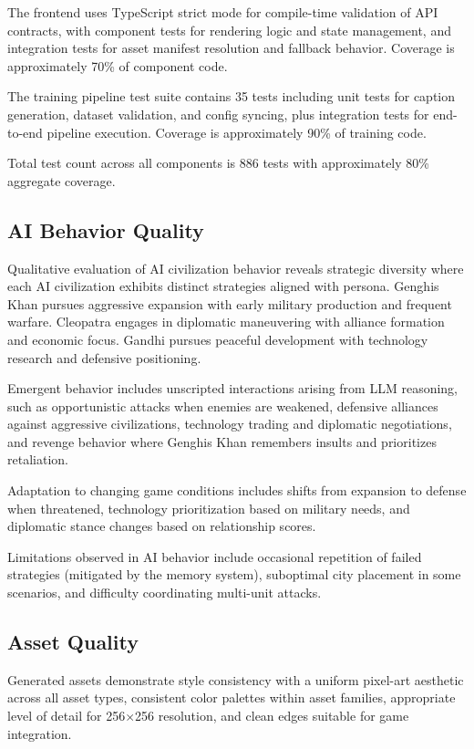 \documentclass[conference]{IEEEtran}
\begin{document}
The frontend uses TypeScript strict mode for compile-time validation of API contracts, with component tests for rendering logic and state management, and integration tests for asset manifest resolution and fallback behavior. Coverage is approximately 70\% of component code.

The training pipeline test suite contains 35 tests including unit tests for caption generation, dataset validation, and config syncing, plus integration tests for end-to-end pipeline execution. Coverage is approximately 90\% of training code.

Total test count across all components is 886 tests with approximately 80\% aggregate coverage.

\subsection{AI Behavior Quality}

Qualitative evaluation of AI civilization behavior reveals strategic diversity where each AI civilization exhibits distinct strategies aligned with persona. Genghis Khan pursues aggressive expansion with early military production and frequent warfare. Cleopatra engages in diplomatic maneuvering with alliance formation and economic focus. Gandhi pursues peaceful development with technology research and defensive positioning.

Emergent behavior includes unscripted interactions arising from LLM reasoning, such as opportunistic attacks when enemies are weakened, defensive alliances against aggressive civilizations, technology trading and diplomatic negotiations, and revenge behavior where Genghis Khan remembers insults and prioritizes retaliation.

Adaptation to changing game conditions includes shifts from expansion to defense when threatened, technology prioritization based on military needs, and diplomatic stance changes based on relationship scores.

Limitations observed in AI behavior include occasional repetition of failed strategies (mitigated by the memory system), suboptimal city placement in some scenarios, and difficulty coordinating multi-unit attacks.

\subsection{Asset Quality}

Generated assets demonstrate style consistency with a uniform pixel-art aesthetic across all asset types, consistent color palettes within asset families, appropriate level of detail for 256$\times$256 resolution, and clean edges suitable for game integration.
\end{document}
